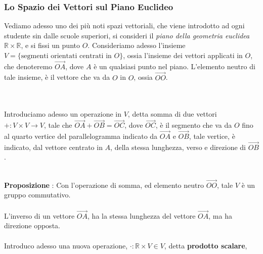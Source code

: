 \documentclass[12pt, letterpaper]{article}
\newcommand{\R}{{\mathbb R}}
\newcommand{\acc}{\\\hphantom{}\\}
\begin{document}
\subsubsection{Lo Spazio dei Vettori sul Piano Euclideo}\label{v2O}
Vediamo adesso uno dei più noti spazi vettoriali, che viene introdotto ad ogni studente sin dalle scuole 
superiori, si consideri il \textit{piano della geometria euclidea} \(\R\times \R\), e si fissi un 
punto \(O\). Consideriamo adesso l'insieme \(V=\{\text{segmenti orientati centrati in } O\}\), ossia l'insieme 
dei vettori applicati in \(O\), che denoteremo \(\vec{OA}\), dove \(A\) è un qualsiasi punto nel piano. L'elemento neutro di tale insieme, è il vettore 
che va da \(O\) in \(O\), ossia \(\vec{OO}\).
\begin{figure}[h]
\end{figure}\acc
Introduciamo adesso un operazione in \(V\), detta somma di due vettori \(+ : V\times V \rightarrow V\), 
tale che  \(\vec{OA}+\vec{OB}=\vec{OC}\), dove \(\vec{OC}\), è il segmento che va da \(O\) fino al quarto 
vertice del parallelogramma indicato da \(\vec{OA}\) e \(\vec{OB}\), tale vertice, è indicato, 
dal vettore centrato in \(A\), della stessa lunghezza, verso e direzione di \(\vec{OB}\).\hphantom{}\acc
\begin{figure}[h]
\end{figure}
\textbf{Proposizione }: Con l'operazione di somma, ed elemento neutro \(\vec{OO}\), tale \(V\) è un 
gruppo commutativo.\acc 
L'inverso di un vettore \(\vec{OA}\), ha la stessa lunghezza del vettore \(\vec{OA}\), 
ma ha direzione opposta.\acc
Introduco adesso una nuova operazione, \(\cdot : \R\times V \in V\), detta \textbf{prodotto scalare}, 
\end{document}
